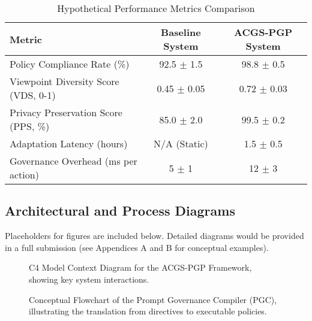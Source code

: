\documentclass[sigconf,review,screen]{acmart}
\begin{document}
\begin{table}[htbp]
  \caption{Hypothetical Performance Metrics Comparison}
  \label{tab:hypothetical_results}
  \begin{tabular}{@{}lcc@{}}
    \toprule
    Metric & Baseline System & ACGS-PGP System \\
    \midrule
    Policy Compliance Rate (\%) & 92.5 $\pm$ 1.5 & 98.8 $\pm$ 0.5 \\
    Viewpoint Diversity Score (VDS, 0-1) & 0.45 $\pm$ 0.05 & 0.72 $\pm$ 0.03 \\
    Privacy Preservation Score (PPS, \%) & 85.0 $\pm$ 2.0 & 99.5 $\pm$ 0.2 \\
    Adaptation Latency (hours) & N/A (Static) & 1.5 $\pm$ 0.5 \\
    Governance Overhead (ms per action) & 5 $\pm$ 1 & 12 $\pm$ 3 \\
    \bottomrule
  \end{tabular}
\end{table}

\subsection{Architectural and Process Diagrams}
Placeholders for figures are included below. Detailed diagrams would be provided in a full submission (see Appendices A and B for conceptual examples).

\begin{figure}[htbp]
  \centering
  \caption{C4 Model Context Diagram for the ACGS-PGP Framework, showing key system interactions.}
  \label{fig:c4_context_main}
\end{figure}

\begin{figure}[htbp]
  \centering
  \caption{Conceptual Flowchart of the Prompt Governance Compiler (PGC), illustrating the translation from directives to executable policies.}
  \label{fig:pgc_flowchart_main}
\end{figure}
\end{document}

